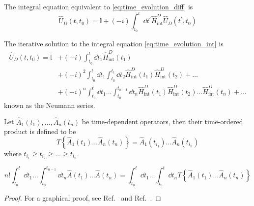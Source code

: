 \begin{lemma}\label{thm:time_evolution_int}
	The integral equation equivalent to \cref{eq:time_evolution_diff} is
	\begin{equation}
		\hat{U}_D(t,t_0)
		=
		\mathbb{I}
		+
		(-i)
		\int_{t_0}^t\dd{t^\prime}
		\hat{H}_\text{int}^D
		\hat{U}_D(t^\prime,t_0)
		\label{eq:time_evolution_int}
	\end{equation}
\end{lemma}
\begin{lemma}\label{thm:time_evolution_iter_sol}
	The iterative solution to the integral equation \cref{eq:time_evolution_int} is
	\begin{equation}
		\begin{split}
			\hat{U}_D(t,t_0)
			=
			\mathbb{I}
			&+
			(-i)
			\int_{t_0}^t\dd{t_1}
			\hat{H}_\text{int}^D(t_1)
			\\
			&+
			(-i)^2
			\int_{t_0}^t\dd{t_1}
			\int_{t_0}^{t_1}\dd{t_2}
			\hat{H}_\text{int}^D(t_1)
			\hat{H}_\text{int}^D(t_2)
			+\dots
			\\
			&+
			(-i)^n
			\int_{t_0}^t\dd{t_1}
			\dots
			\int_{t_0}^{t_{n-1}}\dd{t_n}
			\hat{H}_\text{int}^D(t_1)
			\hat{H}_\text{int}^D(t_2)
			\dots
			\hat{H}_\text{int}^D(t_n)
			+\dots
		\end{split}
	\end{equation}
	known as the Neumann series.
\end{lemma}
\begin{definition}
	Let $\hat{A}_1(t_1),\dots,\hat{A}_n(t_n)$ be time-dependent operators, then their time-ordered product is defined to be
	\begin{equation}
		T\left\{
			\hat{A}_1(t_1)
			\dots
			\hat{A}_n(t_n)
		\right\}
		=
		\hat{A}_1(t_{i_1})
		\dots
		\hat{A}_n(t_{i_n})
	\end{equation}
	where $t_{i_1}\geq t_{i_2}\geq\dots\geq t_{i_n}$.
\end{definition}
\begin{lemma}\label{thm:time_ordered_integral}
	\begin{equation}
		n!
		\int_{t_0}^t\dd{t_1}
		\dots
		\int_{t_0}^{t_{n-1}}\dd{t_n}
		\hat{A}(t_1)
		\dots
		\hat{A}(t_n)
		=
		\int_{t_0}^t\dd{t_1}
		\dots
		\int_{t_0}^t\dd{t_n}
		T\left\{
			\hat{A}_1(t_1)
			\dots
			\hat{A}_n(t_n)
		\right\}
	\end{equation}
\end{lemma}
\begin{proof}
	For a graphical proof, see Ref.~\cite[p.~218]{Greiner2013} and Ref.~\cite[p.~85]{Peskin1995}.
\end{proof}
